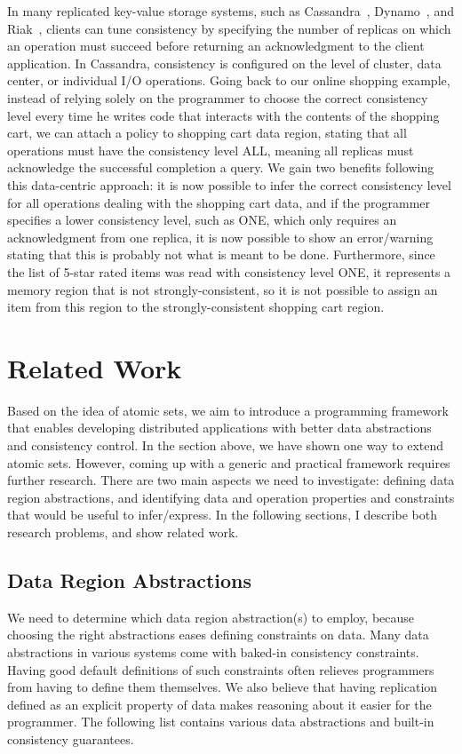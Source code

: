 \documentclass[]{usiinfprospectus}
\begin{document}
In many replicated key-value storage systems, such as Cassandra~\cite{lakshman2010cassandra}, Dynamo~\cite{hastorun2007dynamo}, and Riak~\cite{redmond2012seven}, clients can tune consistency by specifying the number of replicas on which an operation must succeed before returning an acknowledgment to the client application. In Cassandra, consistency is configured on the level of cluster, data center, or individual I/O operations. Going back to our online shopping example, instead of relying solely on the programmer to choose the correct consistency level every time he writes code that interacts with the contents of the shopping cart, we can attach a policy to shopping cart data region, stating that all operations must have the consistency level ALL, meaning all replicas must acknowledge the successful completion a query. We gain two benefits following this data-centric approach: it is now possible to infer the correct consistency level for all operations dealing with the shopping cart data, and if the programmer specifies a lower consistency level, such as ONE, which only requires an acknowledgment from one replica, it is now possible to show an error/warning stating that this is probably not what is meant to be done. Furthermore, since the list of 5-star rated items was read with consistency level ONE, it represents a memory region that is not strongly-consistent, so it is not possible to assign an item from this region to the strongly-consistent shopping cart region.

\section{Related Work}

Based on the idea of atomic sets, we aim to introduce a programming framework that enables developing distributed applications with better data abstractions and consistency control. In the section above, we have shown one way to extend atomic sets. However, coming up with a generic and practical framework requires further research. There are two main aspects we need to investigate: defining data region abstractions, and identifying data and operation properties and constraints that would be useful to infer/express. In the following sections, I describe both research problems, and show related work.

\subsection{Data Region Abstractions}
We need to determine which data region abstraction(s) to employ, because choosing the right abstractions eases defining constraints on data. Many data abstractions in various systems come with baked-in consistency constraints. Having good default definitions of such constraints often relieves programmers from having to define them themselves. We also believe that having replication defined as an explicit property of data makes reasoning about it easier for the programmer. The following list contains various data abstractions and built-in consistency guarantees. 
\end{document}
